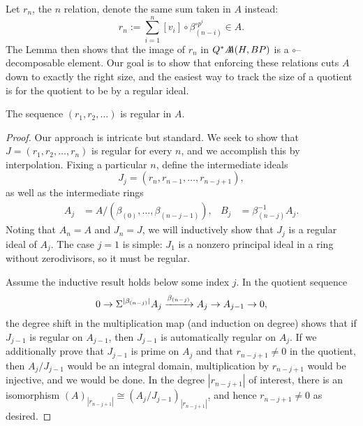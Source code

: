 Let $r_n$, the $n${\th} relation, denote the same sum taken in $A$ instead: \[r_n := \sum_{i=1}^n [v_i] \circ \beta_{(n-i)}^{\circ p^i} \in A.\]  The Lemma then shows that the image of $r_n$ in $Q^* \AA(H, BP)$ is a $\circ$--decomposable element.  Our goal is to show that enforcing these relations cuts $A$ down to exactly the right size, and the easiest way to track the size of a quotient is for the quotient to be by a regular ideal.

\begin{lemma}
The sequence $(r_1, r_2, \ldots)$ is regular in $A$.
\end{lemma}
\begin{proof}
Our approach is intricate but standard.  We seek to show that $J = (r_1, r_2, \ldots, r_n)$ is regular for every $n$, and we accomplish this by interpolation.  Fixing a particular $n$, define the intermediate ideals \[J_j = (r_n, r_{n-1}, \ldots, r_{n-j+1}),\] as well as the intermediate rings
\begin{align*}
A_j & = A / (\beta_{(0)}, \ldots, \beta_{(n-j-1)}), &
B_j & = \beta_{(n-j)}^{-1} A_j.
\end{align*}
Noting that $A_n = A$ and $J_n = J$, we will inductively show that $J_j$ is a regular ideal of $A_j$.  The case $j = 1$ is simple: $J_1$ is a nonzero principal ideal in a ring without zerodivisors, so it must be regular.

Assume the inductive result holds below some index $j$.  In the quotient sequence \[0 \to \Susp^{|\beta_{(n-j)}|} A_j \xrightarrow{\beta_{(n-j)}} A_j \to A_{j-1} \to 0,\] the degree shift in the multiplication map (and induction on degree) shows that if $J_{j-1}$ is regular on $A_{j-1}$, then $J_{j-1}$ is automatically regular on $A_j$.  If we additionally prove that $J_{j-1}$ is prime on $A_j$ and that $r_{n-j+1} \ne 0$ in the quotient, then $A_j / J_{j-1}$ would be an integral domain, multiplication by $r_{n-j+1}$ would be injective, and we would be done.  In the degree $|r_{n-j+1}|$ of interest, there is an isomorphism $(A)_{|r_{n-j+1}|} \cong (A_j / J_{j-1})_{|r_{n-j+1}|}$, and hence $r_{n-j+1} \ne 0$ as desired.


\end{proof}
